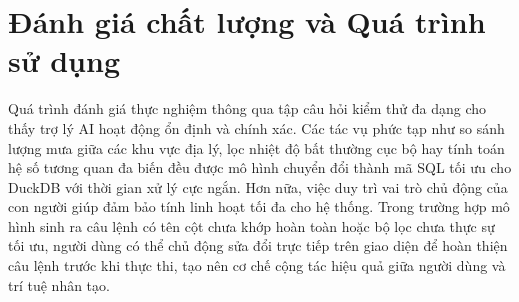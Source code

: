 \section{Đánh giá chất lượng và Quá trình sử dụng}
Quá trình đánh giá thực nghiệm thông qua tập câu hỏi kiểm thử đa dạng cho thấy trợ lý AI hoạt động ổn định và chính xác. Các tác vụ phức tạp như so sánh lượng mưa giữa các khu vực địa lý, lọc nhiệt độ bất thường cục bộ hay tính toán hệ số tương quan đa biến đều được mô hình chuyển đổi thành mã SQL tối ưu cho DuckDB với thời gian xử lý cực ngắn. Hơn nữa, việc duy trì vai trò chủ động của con người giúp đảm bảo tính linh hoạt tối đa cho hệ thống. Trong trường hợp mô hình sinh ra câu lệnh có tên cột chưa khớp hoàn toàn hoặc bộ lọc chưa thực sự tối ưu, người dùng có thể chủ động sửa đổi trực tiếp trên giao diện để hoàn thiện câu lệnh trước khi thực thi, tạo nên cơ chế cộng tác hiệu quả giữa người dùng và trí tuệ nhân tạo.

